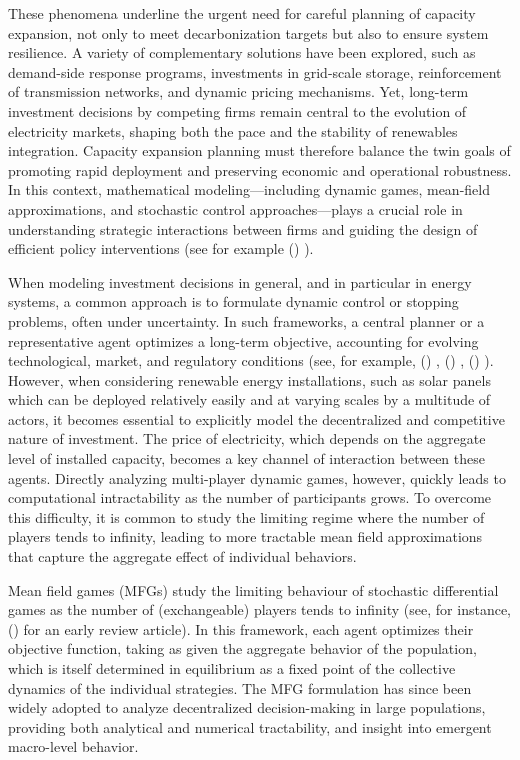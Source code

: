 \documentclass[12pt]{article}
\newcommand\citeayn[2][]{\citeauthor*{#2} (\citeyear{#2}) \cite[#1]{#2}}
\begin{document}
These phenomena underline the urgent need for careful planning of capacity expansion, not only to meet decarbonization targets but also to ensure system resilience. A variety of complementary solutions have been explored, such as demand-side response programs, investments in grid-scale storage, reinforcement of transmission networks, and dynamic pricing mechanisms.
Yet, long-term investment decisions by competing firms remain central to the evolution of electricity markets, shaping both the pace and the stability of renewables integration. Capacity expansion planning must therefore balance the twin goals of promoting rapid deployment and preserving economic and operational robustness. In this context, mathematical modeling—including dynamic games, mean-field approximations, and stochastic control approaches—plays a crucial role in understanding strategic interactions between firms and guiding the design of efficient policy interventions (see for example \citeayn{cacciarelli2025impact}).


When modeling investment decisions in general, and in particular in energy systems, a common approach is to formulate dynamic control or stopping problems, often under uncertainty. In such frameworks, a central planner or a representative agent optimizes a long-term objective, accounting for evolving technological, market, and regulatory conditions (see, for example, \citeayn{aid2009structural}, \citeayn{carmona2010valuation}, \citeayn{ludkovski2016technology}). However, when considering renewable energy installations, such as solar panels which can be deployed relatively easily and at varying scales by a multitude of actors, it becomes essential to explicitly model the decentralized and competitive nature of investment. The price of electricity, which depends on the aggregate level of installed capacity, becomes a key channel of interaction between these agents. Directly analyzing multi-player dynamic games, however, quickly leads to computational intractability as the number of participants grows. To overcome this difficulty, it is common to study the limiting regime where the number of players tends to infinity, leading to more tractable mean field approximations that capture the aggregate effect of individual behaviors.

Mean field games (MFGs) 
study the limiting behaviour of stochastic differential games as the number of (exchangeable) players tends to infinity (see, for instance, \citeayn{gueant2011mean} for an early review article). 
In this framework, each agent optimizes their objective function, taking as given the aggregate behavior of the population, which is itself determined in equilibrium as a fixed point of the collective dynamics of the individual strategies. The MFG formulation has since been widely adopted to analyze decentralized decision-making in large populations, providing both analytical and numerical tractability, and insight into emergent macro-level behavior. 
\end{document}
